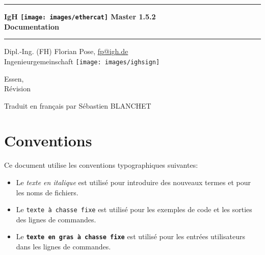 \documentclass[a4paper,12pt,BCOR=6mm,bibtotoc,idxtotoc]{scrbook}
\makeatletter
\renewcommand*{\lstlistoflistings}{%
  \begingroup
    \if@twocolumn
      \@restonecoltrue\onecolumn
    \else
      \@restonecolfalse
    \fi
    \lol@heading
    \setlength{\parskip}{\z@}%
    \setlength{\parindent}{\z@}%
    \setlength{\parfillskip}{\z@ \@plus 1fil}%
    \@starttoc{lol}%
    \if@restonecol\twocolumn\fi
  \endgroup
}
\newcommand{\IgH}{\raisebox{-0.7667ex}
  {\texttt{[image: images/ighsign]}}}
\newcommand{\masterversion}{1.5.2}
\makeatother
\begin{document}
\pagestyle{empty}

\begin{titlepage}
  \begin{center}
    \rule{\textwidth}{1.5mm}

    {\Huge\sf\textbf{IgH \texttt{[image: images/ethercat]}
      Master \masterversion}\\[1ex]
      \textbf{Documentation}}

    \vspace{1ex}
    \rule{\textwidth}{1.5mm}

    \vspace{\fill} {\Large Dipl.-Ing. (FH) Florian Pose,
    \url{fp@igh.de}\\[1ex] Ingenieurgemeinschaft \IgH}

    \vspace{\fill}
    {\Large Essen, \rcsInfoLongDate\\[1ex]
      R\'evision \rcsInfoRevision}

    \vspace{\fill} {\Large Traduit en fran\c{c}ais par S\'ebastien BLANCHET }


  \end{center}
\end{titlepage}


\pagestyle{scrplain}

\tableofcontents
\listoftables
\listoffigures


\newpage
\pagestyle{scrheadings}

\section*{Conventions}

Ce document utilise les conventions typographiques suivantes:

\begin{itemize}

\item Le \textit{texte en italique} est utilis\'e pour introduire des nouveaux termes et pour les noms de fichiers.

\item Le \texttt{texte \`a chasse fixe} est utilis\'e pour les exemples de code et les sorties des lignes de commandes.

\item Le \texttt{\textbf{texte en gras \`a chasse fixe}} est utilis\'e pour les entr\'ees utilisateurs dans les lignes de commandes.

\end{itemize}
\end{document}
